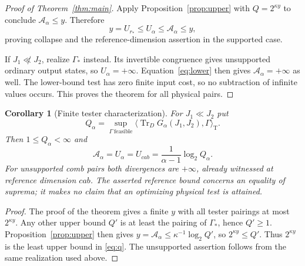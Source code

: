 \documentclass[11pt]{article}
\newcommand{\Tr}{\operatorname{Tr}}
\newcommand{\G}{G_\alpha}
\newcommand{\U}{U_\alpha}
\newcommand{\Adiv}{\mathcal A_\alpha}
\newcommand{\pair}[2]{\langle #1,#2\rangle_{\mathrm T}}
\newtheorem{corollary}[theorem]{Corollary}
\theoremstyle{remark}
\begin{document}
\begin{proof}[Proof of Theorem~\ref{thm:main}]
Apply Proposition~\ref{prop:upper} with $Q=2^{\kappa y}$ to conclude
$\Adiv\leq y$. Therefore
\[
 y=U_{r_*}\leq\U\leq\Adiv\leq y,
\]
proving collapse and the reference-dimension assertion in the supported case.

If $J_1\not\ll J_2$, realize $\Gamma_*$ instead. Its invertible congruence
gives unsupported ordinary output states, so $\U=+\infty$.
Equation~\eqref{eq:lower} then gives $\Adiv=+\infty$ as well. The lower-bound
test has zero finite input cost, so no subtraction of infinite values occurs.
This proves the theorem for all physical pairs.
\end{proof}

\begin{corollary}[Finite tester characterization]\label{cor:formula}
For $J_1\ll J_2$ put
\begin{equation}\label{eq:q}
 Q_\alpha=\sup_{\Gamma\ \mathrm{feasible}}
                  \pair{\Tr_D\G(J_1,J_2)}{\Gamma}.
\end{equation}
Then $1\leq Q_\alpha<\infty$ and
\begin{equation}\label{eq:formula}
 \Adiv=\U=U_{cab}=\frac{1}{\alpha-1}\log_2Q_\alpha.
\end{equation}
For unsupported comb pairs both divergences are $+\infty$, already witnessed
at reference dimension $cab$. The asserted reference bound concerns an
equality of suprema; it makes no claim that an optimizing physical test is
attained.
\end{corollary}
\begin{proof}
The proof of the theorem gives a finite $y$ with all tester pairings at most
$2^{\kappa y}$. Any other upper bound $Q'$ is at least the pairing of
$\Gamma_*$, hence $Q'\geq1$. Proposition~\ref{prop:upper} then gives
$y=\Adiv\leq\kappa^{-1}\log_2Q'$, so $2^{\kappa y}\leq Q'$.
Thus $2^{\kappa y}$ is the least upper bound in \eqref{eq:q}.
The unsupported assertion follows from the same realization used above.
\end{proof}
\end{document}
